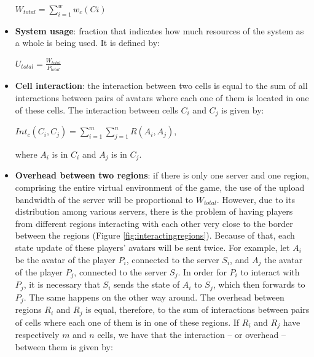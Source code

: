 \begin{itemize}
		\begin{center}
			$\displaystyle W_{total} = \sum_{i=1}^{w} w_c(Ci)$
		\end{center}
	
	
	\item \textbf{System usage}: fraction that indicates how much resources of the system as a whole is being used. It is defined by:

		\begin{center}
			$\displaystyle U_{total} = \frac{W_{total}}{P_{total}}$
		\end{center}
	
	\item \textbf{Cell interaction}: the interaction between two cells is equal to the sum of all interactions between pairs of avatars where each one of them is located in one of these cells. The interaction between cells $C_i$ and $C_j$ is given by:
	
		\begin{center}
			$\displaystyle Int_c(C_i,C_j) = \sum_{i=1}^{m} \sum_{j=1}^{n} R(A_i,A_j)$,
			
			where $A_i$ is in $C_i$ and $A_j$ is in $C_j$.
		\end{center}
	
	\item \textbf{Overhead between two regions}: if there is only one server and one region, comprising the entire virtual environment of the game, the use of the upload bandwidth of the server will be proportional to $W_{total}$. However, due to its distribution among various servers, there is the problem of having players from different regions interacting with each other very close to the border between the regions (Figure \ref{fig:interactingregions}). Because of that, each state update of these players' avatars will be sent twice. For example, let $A_i$ be the avatar of the player $P_i$, connected to the server $S_i$, and $A_j$ the avatar of the player $P_j$, connected to the server $S_j$. In order for $P_i$ to interact with $P_j$, it is necessary that $S_i$ sends the state of $A_i$ to $S_j$, which then forwards to $P_j$. The same happens on the other way around. The overhead between regions $R_i$ and $R_j$ is equal, therefore, to the sum of interactions between pairs of cells where each one of them is in one of these regions. If $R_i$ and $R_j$ have respectively $m$ and $n$ cells, we have that the interaction -- or overhead -- between them is given by:
	

\end{itemize}
